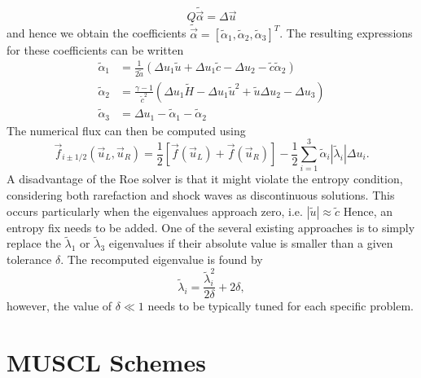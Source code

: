 \begin{equation}
	Q\tilde{\vec \alpha} = \Delta \vec u
\end{equation}
and hence we obtain the coefficients $\tilde{\vec \alpha}=[\tilde\alpha_1,\tilde\alpha_2,\tilde\alpha_3]^T$. The resulting expressions for these coefficients can be written
\begin{align}
	\tilde \alpha_1 &= \frac{1}{2\tilde a}\left(\Delta u_1 \tilde u + \Delta u_1\tilde c - \Delta u_2 - \tilde c \tilde \alpha_2\right)\\ 
	\tilde \alpha_2 &= \frac{\gamma-1}{\tilde c^2} \left(\Delta u_1 \tilde H - \Delta u_1 \tilde u^2 + \tilde u \Delta u_2 - \Delta u_3 \right)\\
	\tilde \alpha_3 &= \Delta u_1 - \tilde\alpha_1 - \tilde\alpha_2
\end{align}
The numerical flux can then be computed using
\begin{equation}
	\vec f_{i\pm1/2}(\vec u_L, \vec u_R) = \frac{1}{2} \left[\vec f(\vec u_L) + \vec f(\vec u_R)\right] - \frac{1}{2} \sum_{i=1}^3 \tilde \alpha_i |\tilde \lambda_i| \Delta u_i.
\end{equation}
A disadvantage of the Roe solver is that it might violate the entropy condition, considering both rarefaction and shock waves as discontinuous solutions. This occurs particularly when the eigenvalues approach zero, i.e. $|\tilde u|\approx \tilde c$ Hence, an entropy fix needs to be added. One of the several existing approaches is to simply replace the $\tilde\lambda_1$ or $\tilde\lambda_3$ eigenvalues if their absolute value is smaller than a given tolerance $\delta$. The recomputed eigenvalue is found by
\begin{equation}
	\tilde\lambda_i = \frac{\tilde\lambda_i^2}{2\delta} + 2\delta,
\end{equation}
however, the value of $\delta\ll1$ needs to be typically tuned for each specific problem.

\section{MUSCL Schemes}

